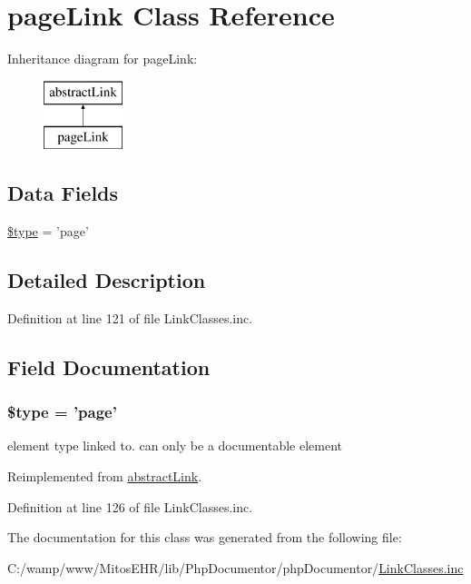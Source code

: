 \hypertarget{classpage_link}{\section{page\-Link \-Class \-Reference}
\label{classpage_link}
}
\-Inheritance diagram for page\-Link\-:\begin{figure}[H]
\begin{center}
\leavevmode
\includegraphics[height=2.000000cm]{classpage_link}
\end{center}
\end{figure}
\subsection*{\-Data \-Fields}
\begin{DoxyCompactItemize}
\item 
\hyperlink{classpage_link_a9a4a6fba2208984cabb3afacadf33919}{\$type} = 'page'
\end{DoxyCompactItemize}


\subsection{\-Detailed \-Description}


\-Definition at line 121 of file \-Link\-Classes.\-inc.



\subsection{\-Field \-Documentation}
\hypertarget{classpage_link_a9a4a6fba2208984cabb3afacadf33919}{
\subsubsection[{\$type}]{\setlength{\rightskip}{0pt plus 5cm}\$type = 'page'}}\label{classpage_link_a9a4a6fba2208984cabb3afacadf33919}
element type linked to. can only be a documentable element 

\-Reimplemented from \hyperlink{classabstract_link_a9a4a6fba2208984cabb3afacadf33919}{abstract\-Link}.



\-Definition at line 126 of file \-Link\-Classes.\-inc.



\-The documentation for this class was generated from the following file\-:\begin{DoxyCompactItemize}
\item 
\-C\-:/wamp/www/\-Mitos\-E\-H\-R/lib/\-Php\-Documentor/php\-Documentor/\hyperlink{_link_classes_8inc}{\-Link\-Classes.\-inc}\end{DoxyCompactItemize}
